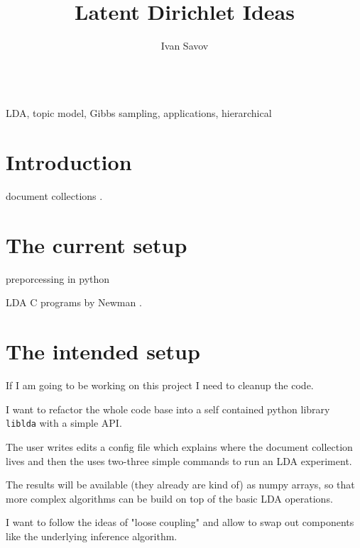 \documentclass[11pt]{article}
\author{Ivan Savov}
\title{ {\LARGE Latent Dirichlet Ideas } }
\begin{document}
\maketitle


\ \\
 LDA, topic model, Gibbs sampling, applications, hierarchical


\section{Introduction}

    
    document collections \cite{Blei2003,Blei2009}.



\section{The current setup}
    
    preporcessing in python

    LDA C programs by Newman  \cite{NewmanCode}.
	
\section{The intended setup}

    If I am going to be working on this project I need to cleanup the code.

    I want to refactor the whole 
    code base into a self contained python library \texttt{liblda} with a simple API.
    
    The user writes edits a config file which explains where the document collection lives
    and then the uses two-three simple commands to run an LDA experiment.

    The results will be available (they already are kind of) as numpy arrays, so that
    more complex algorithms can be build on top of the basic LDA operations.

    I want to follow the ideas of "loose coupling" and allow to swap out components like
    the underlying inference algorithm.
\end{document}
